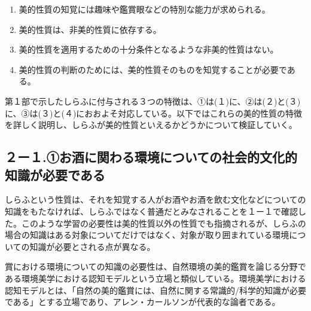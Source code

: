 \documentclass[b5j,twoside,twocolumn]{utarticle}
\begin{document}
{\begin{enumerate}
 \item 美的性質の知覚には趣味や鑑賞眼などの特別な能力が求められる。
 \item 美的性質は、非美的性質に依存する。
 \item 美的性質を適用するための十分条件となるような非美的性質はない。
 \item 美的性質の判断のためには、美的性質そのものを知覚することが必要である。
\end{enumerate}

第１部で示したしらふに付与される３つの特徴は、①は(１)に、②は(２)と(３)に、③は(３)と(４)におおよそ対応している。以下ではこれらの美的性質の特徴を詳しく説明し、しらふが美的性質といえるかどうかについて検証していく。

\subsection{２ー１.①お酒に関わる環境についての社会的文化的知識が必要である}

しらふという性質は、それを知覚する人がお酒やお酒を飲む文化などについての知識をもたなければ、しらふではなく普通だとみなされることを１ー１で確認した。このような学習の必要性は美的性質以外の性質でも指摘されるが、しらふの場合の知識はある対象についてだけではなく、対象が取り囲まれている環境についての知識が必要とされる点が異なる。

賞における環境についての知識の必要性は、自然環境の美的鑑賞を論じる分野である環境美学における認知モデルという立場と類似している。環境美学における認知モデルとは、「自然の美的鑑賞には、自然に関する常識的/科学的知識が必要である」とする立場であり、アレン・カールソンが代表的な論者である。

}
\end{document}
